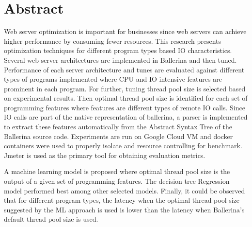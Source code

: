 \chapter*{Abstract}

Web server optimization is important for businesses since web servers can achieve higher performance by consuming fewer resources. This research presents optimization techniques for different program types based IO characteristics. Several web server architectures are implemented in Ballerina and then tuned. Performance of each server architecture and tunes are evaluated against different types of programs implemented where CPU and IO intensive features are prominent in each program. For further, tuning thread pool size is selected based on experimental results. Then optimal thread pool size is identified for each set of programming features where features are different types of remote IO calls. Since IO calls are part of the native representation of ballerina, a parser is implemented to extract these features automatically from the Abstract Syntax Tree of the Ballerina source code.  Experiments are run on Google Cloud VM and docker containers were used to properly isolate and resource controlling for benchmark. Jmeter is used as the primary tool for obtaining evaluation metrics.

A machine learning model is proposed where optimal thread pool size is the output of a given set of programming features. The decision tree Regression model performed best among other selected models. Finally, it could be observed that for different program types, the latency when the optimal thread pool size suggested by the ML approach is used is lower than the latency when Ballerina's default thread pool size is used.